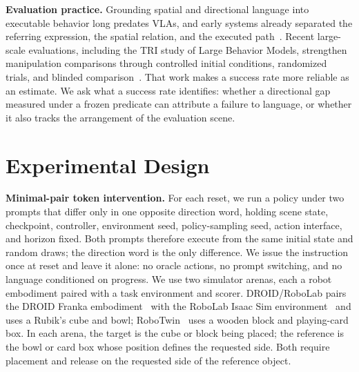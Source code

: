 \documentclass[letterpaper,10pt,conference]{ieeeconf}%
\newcommand{\tightparagraph}[1]{\vspace{0.25em}\noindent\textbf{#1}}
\begin{document}
\tightparagraph{Evaluation practice.}
Grounding spatial and directional language into executable behavior long predates VLAs, and early systems already separated the referring expression, the spatial relation, and the executed path~\cite{kollar2010directions,tellex2011understanding}.
Recent large-scale evaluations, including the TRI study of Large Behavior Models, strengthen manipulation comparisons through controlled initial conditions, randomized trials, and blinded comparison~\cite{trilbm2025careful}.
That work makes a success rate more reliable as an estimate.
We ask what a success rate identifies: whether a directional gap measured under a frozen predicate can attribute a failure to language, or whether it also tracks the arrangement of the evaluation scene.

\section{Experimental Design}
\label{sec:method}

\tightparagraph{Minimal-pair token intervention.}
For each reset, we run a policy under two prompts that differ only in one opposite direction word, holding scene state, checkpoint, controller, environment seed, policy-sampling seed, action interface, and horizon fixed.
Both prompts therefore execute from the same initial state and random draws; the direction word is the only difference.
We issue the instruction once at reset and leave it alone: no oracle actions, no prompt switching, and no language conditioned on progress.
We use two simulator arenas, each a robot embodiment paired with a task environment and scorer.
DROID/RoboLab pairs the DROID Franka embodiment~\cite{khazatsky2024droid} with the RoboLab Isaac Sim environment~\cite{nvlabs2026robolab} and uses a Rubik's cube and bowl; RoboTwin~\cite{mu2025robotwin} uses a wooden block and playing-card box.
In each arena, the target is the cube or block being placed; the reference is the bowl or card box whose position defines the requested side.
Both require placement and release on the requested side of the reference object.
\end{document}
